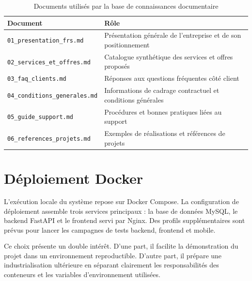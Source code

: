 \begin{table}[H]
\centering
\caption{Documents utilisés par la base de connaissances documentaire}
\label{tab:rag_docs}
\begin{tabularx}{\textwidth}{|l|X|}
\hline
\textbf{Document} & \textbf{Rôle} \\
\hline
\texttt{01\_presentation\_frs.md} & Présentation générale de l'entreprise et de son positionnement \\
\hline
\texttt{02\_services\_et\_offres.md} & Catalogue synthétique des services et offres proposés \\
\hline
\texttt{03\_faq\_clients.md} & Réponses aux questions fréquentes côté client \\
\hline
\texttt{04\_conditions\_generales.md} & Informations de cadrage contractuel et conditions générales \\
\hline
\texttt{05\_guide\_support.md} & Procédures et bonnes pratiques liées au support \\
\hline
\texttt{06\_references\_projets.md} & Exemples de réalisations et références de projets \\
\hline
\end{tabularx}
\end{table}


\section{Déploiement Docker}
L'exécution locale du système repose sur Docker Compose. La configuration de déploiement assemble trois services principaux : la base de données MySQL, le backend FastAPI et le frontend servi par Nginx. Des profils supplémentaires sont prévus pour lancer les campagnes de tests backend, frontend et mobile.\par
\vspace{0.3cm}

Ce choix présente un double intérêt. D'une part, il facilite la démonstration du projet dans un environnement reproductible. D'autre part, il prépare une industrialisation ultérieure en séparant clairement les responsabilités des conteneurs et les variables d'environnement utilisées.

